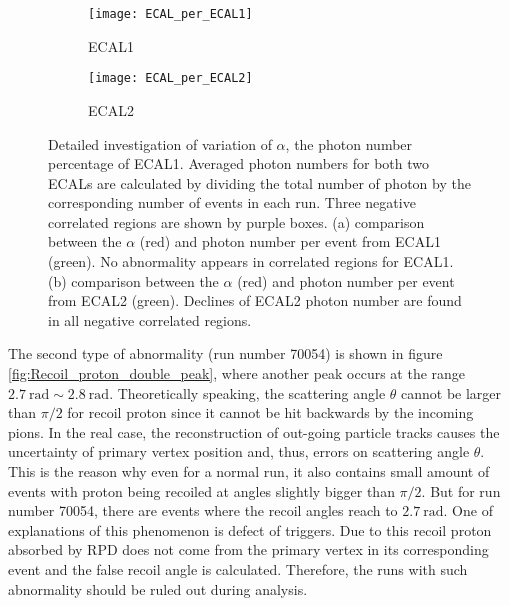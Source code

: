 \begin{figure*}[!h]
	\centering
	\vspace{1cm}
	\begin{subfigure}{\textwidth}
		\texttt{[image: ECAL\_per\_ECAL1]}
		\caption{ECAL1}
		\label{fig:ECAL_per_ECAL1}
		\vspace{2cm}
	\end{subfigure}
	\begin{subfigure}{\textwidth}
		\texttt{[image: ECAL\_per\_ECAL2]}
		\caption{ECAL2}
		\label{fig:ECAL_per_ECAL2}
	\end{subfigure}
	\caption{Detailed investigation of variation of $\alpha$, the photon number percentage of ECAL1. Averaged photon numbers for both two ECALs are calculated by dividing the total number of photon by the corresponding number of events in each run. Three negative correlated regions are shown by purple boxes. (a) comparison between the $\alpha$ (red) and photon number per event from ECAL1 (green). No abnormality appears in correlated regions for ECAL1. (b) comparison between the $\alpha$ (red) and photon number per event from ECAL2 (green). Declines of ECAL2 photon number are found in all negative correlated regions.}
	\label{fig:ECAL_per_ECAL}
	\vspace{3cm}
\end{figure*}

The second type of abnormality (run number 70054) is shown in figure \ref{fig:Recoil_proton_double_peak}, where another peak occurs at the range $\SI{2.7}{\radian} \sim \SI{2.8}{\radian}$. Theoretically speaking, the scattering angle $\theta$ cannot be larger than $\pi/2$ for recoil proton since it cannot be hit backwards by the incoming pions. In the real case, the reconstruction of out-going particle tracks causes the uncertainty of primary vertex position and, thus, errors on scattering angle $\theta$. This is the reason why even for a normal run, it also contains small amount of events with proton being recoiled at angles slightly bigger than $\pi/2$. But for run number 70054, there are events where the recoil angles reach to $\SI{2.7}{\radian}$. One of explanations of this phenomenon is defect of triggers. Due to this recoil proton absorbed by RPD does not come from the primary vertex in its corresponding event and the false recoil angle is calculated. Therefore, the runs with such abnormality should be ruled out during analysis.




